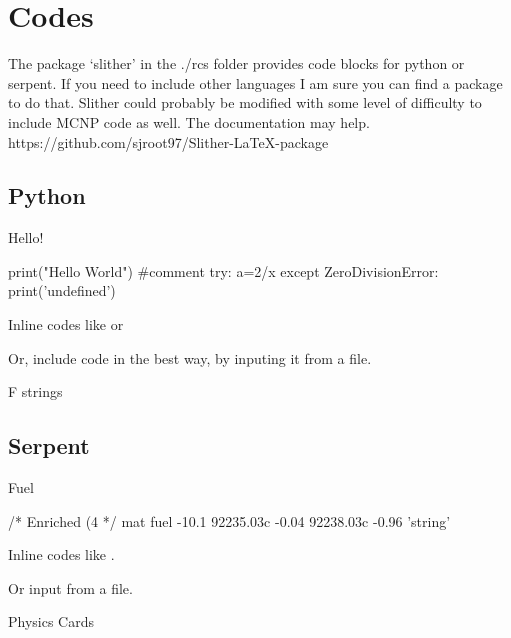 \chapter{Codes}
The package `slither' in the ./rcs folder provides code blocks for python or serpent. If you need to include other languages I am sure you can find a package to do that. Slither could probably be modified with some level of difficulty to include MCNP code as well. The documentation may help.
https://github.com/sjroot97/Slither-LaTeX-package

\section{Python}

\begin{code}\caption{Hello!} \begin{python}
    print("Hello World") #comment
    try:
        a=2/x
    except ZeroDivisionError:
        print('undefined')
\end{python}\label{code:hello}\end{code}

Inline codes like  or 

Or, include code in the best way, by inputing it from a file.
\begin{code}\caption{F strings}
\label{code:fstrings}\end{code}

\newpage
\section{Serpent}

\begin{code}\caption{Fuel} \begin{serpent}
    /*
    Enriched (4%
    */
    mat fuel     -10.1
    92235.03c    -0.04 
    92238.03c    -0.96
    'string'
\end{serpent}\label{code:fuel}\end{code}

Inline codes like .

Or input from a file.
\begin{code}\caption{Physics Cards}
    \label{code:physics}\end{code}


